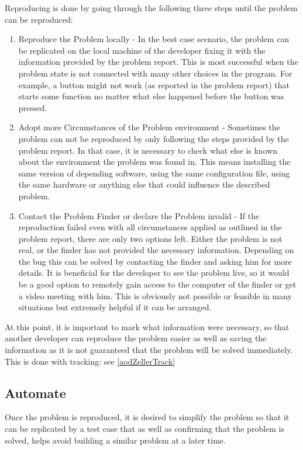 Reproducing is done by going through the following three steps until the problem can be reproduced:
\begin{enumerate}
  \item Reproduce the Problem locally - In the best case scenario, the problem can be replicated on the local machine of the developer fixing it with the information provided by the problem report. This is most successful when the problem state is not connected with many other choices in the program. For example, a button might not work (as reported in the problem report) that starts some function no matter what else happened before the button was pressed.
  \item Adopt more Circumstances of the Problem environment - Sometimes the problem can not be reproduced by only following the steps provided by the problem report. In that case, it is necessary to check what else is known about the environment the problem was found in. This means installing the same version of depending software, using the same configuration file, using the same hardware or anything else that could influence the described problem.
  \item Contact the Problem Finder or declare the Problem invalid - If the reproduction failed even with all circumstances applied as outlined in the problem report, there are only two options left. Either the problem is not real, or the finder has not provided the necessary information. Depending on the bug this can be solved by contacting the finder and asking him for more details. It is beneficial for the developer to see the problem live, so it would be a good option to remotely gain access to the computer of the finder or get a video meeting with him. This is obviously not possible or feasible in many situations but extremely helpful if it can be arranged.
\end{enumerate}

At this point, it is important to mark what information were necessary, so that another developer can reproduce the problem easier as well as saving the information as it is not guaranteed that the problem will be solved immediately. This is done with tracking: see \ref{aodZellerTrack}

\subsection{Automate}
Once the problem is reproduced, it is desired to simplify the problem so that it can be replicated by a test case that as well as confirming that the problem is solved, helps avoid building a similar problem at a later time.

